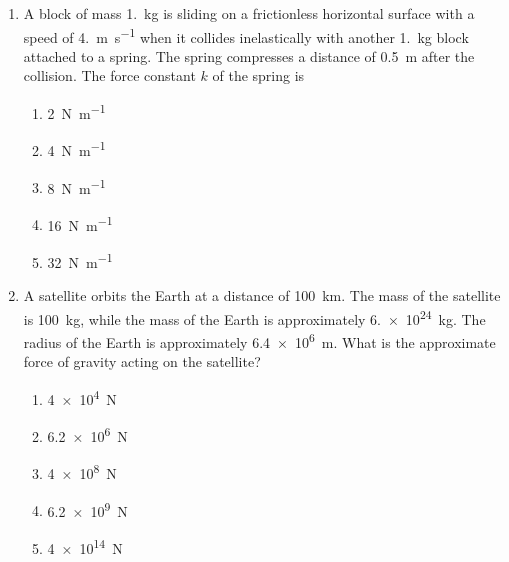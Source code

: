 \documentclass{../../oss-apphys}
\begin{document}
\begin{multicols}{2}
\begin{enumerate}[leftmargin=18pt,resume]
  \item A block of mass \SI{1.}{\kilo\gram} is sliding on a frictionless
    horizontal surface with a speed of \SI{4.}{\metre\per\second} when it
    collides inelastically with another \SI{1.}{\kilo\gram} block attached to a
    spring. The spring compresses a distance of \SI{.5}{\metre} after the
    collision. The force constant $k$ of the spring is
    \begin{center}
    \end{center}
    \begin{enumerate}[noitemsep,topsep=0pt,leftmargin=18pt,label=(\Alph*)]
    \item\SI{2}{\newton\per\metre}
    \item\SI{4}{\newton\per\metre}
    \item\SI{8}{\newton\per\metre}
    \item\SI{16}{\newton\per\metre}
    \item\SI{32}{\newton\per\metre}
    \end{enumerate}

  \item A satellite orbits the Earth at a distance of \SI{100}{\kilo\metre}.
    The mass of the satellite is \SI{100}{\kilo\gram}, while the mass of the
    Earth is approximately \SI{6.e24}{\kilo\gram}. The radius of the Earth is
    approximately \SI{6.4e6}{\metre}. What is the approximate force of gravity
    acting on the satellite?
    \begin{enumerate}[noitemsep,topsep=0pt,leftmargin=18pt,label=(\Alph*)]
    \item\SI{4e4}{\newton}
    \item\SI{6.2e6}{\newton}
    \item\SI{4e8}{\newton}
    \item\SI{6.2e9}{\newton}
    \item\SI{4e14}{\newton}
    \end{enumerate}


\end{enumerate}
\end{multicols}
\end{document}
